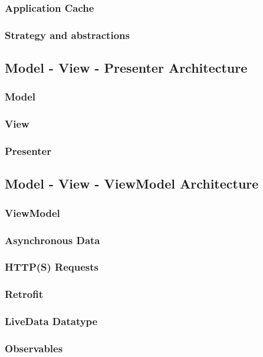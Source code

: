 \subsubsection{Application Cache}
\subsubsection{Strategy and abstractions}
\subsection{Model - View - Presenter Architecture}
\subsubsection{Model}
\subsubsection{View}
\subsubsection{Presenter}
\subsection{Model - View - ViewModel Architecture}
\subsubsection{ViewModel}
\subsubsection{Asynchronous Data}
\subsubsection{HTTP(S) Requests}
\subsubsection{Retrofit}
\subsubsection{LiveData Datatype}
\subsubsection{Observables}